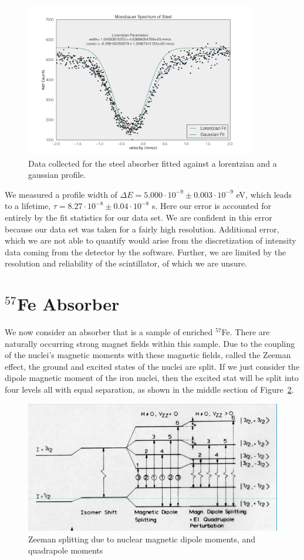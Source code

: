 \documentclass[paper=a4, fontsize=11pt, abstract=on]{scrartcl} %
\numberwithin{equation}{section}
\numberwithin{figure}{section}
\numberwithin{table}{section}
\begin{document}
\begin{figure}[h]
  \centering
  \includegraphics[width=0.9\textwidth]{steelfit}
  \caption{Data collected for the steel absorber fitted against a lorentzian and a gaussian profile.}
  \label{fig:steel}
\end{figure}

We measured a profile width of $\Delta E = 5.000 \cdot 10^{-9} \pm 0.003 \cdot 10^{-9}$ eV, which
leads to a lifetime, $\tau = 8.27 \cdot 10^{-8} \pm 0.04\cdot 10^{-8}$
s. Here our error is accounted for entirely by the fit statistics for
our data set. We are confident in this error because our data set was
taken for a fairly high resolution. Additional error, which we are not
able to quantify would arise from the discretization of intensity data
coming from the detector by the software. Further, we are limited by
the resolution and reliability of the scintillator, of which we are unsure. 


\section{$^{57}$Fe Absorber}
\label{sec:iron}

We now consider an absorber that is a sample of enriched
$^{57}$Fe. There are naturally occurring strong magnet fields within
this sample. Due to the coupling of the nuclei's magnetic moments with
these magnetic fields, called the Zeeman effect, the ground and
excited states of the nuclei are split. If we just consider the dipole
magnetic moment of the iron nuclei, then the excited stat will be
split into four levels all with equal separation, as shown in the
middle section of Figure~\ref{fig:dipsplit}.

\begin{figure}[h]
  \centering
  \includegraphics[width=.65\textwidth]{splits}
  \caption{Zeeman splitting due to nuclear magnetic dipole moments,
    and quadrapole moments \cite{art:slides}} 
  \label{fig:dipsplit}
\end{figure}
\end{document}
